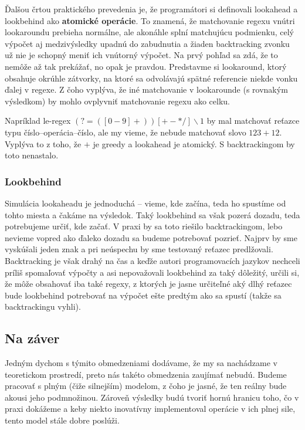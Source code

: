 Ďalšou črtou praktického prevedenia je, že programátori si definovali lookahead a lookbehind ako \textbf{atomické operácie}\cite{LApracticalnote}. To znamená, že matchovanie regexu vnútri lookaroundu prebieha normálne, ale akonáhle splní matchujúcu podmienku, celý výpočet aj medzivýsledky upadnú do zabudnutia a žiaden back\-tracking zvonku už nie je schopný meniť ich vnútorný výpočet. Na prvý pohľad sa zdá, že to nemôže až tak prekážať, no opak je pravdou. Predstavme si lookaround, ktorý obsahuje okrúhle zátvorky, na ktoré sa odvolávajú spätné referencie niekde vonku ďalej v regexe. Z čoho vyplýva, že iné matchovanie v lookarounde (s rovnakým výsledkom) by mohlo ovplyvniť matchovanie regexu ako celku.

Napríklad le-regex $(?=([0-9]+))[+-*/]\backslash 1$ by mal matchovať reťazce typu číslo--operácia--číslo, ale my vieme, že nebude matchovať slovo $123+12$. Vyplýva to z toho, že $+$ je greedy a lookahead je atomický. S backtrackingom by toto nenastalo.

\subsubsection{Lookbehind}
\label{praxlb}

Simulácia lookaheadu je jednoduchá -- vieme, kde začína, teda ho spustíme od tohto miesta a čakáme na výsledok. Taký lookbehind sa však pozerá dozadu, teda potrebujeme určiť, kde začať. V praxi by sa toto riešilo backtrackingom, lebo nevieme vopred ako ďaleko dozadu sa budeme potrebovať pozrieť. Najprv by sme vyskúšali jeden znak a pri neúspechu by sme testovaný reťazec predlžovali. Backtracking je však drahý na čas a keďže autori programovacích jazykov nechceli príliš spomaľovať výpočty a asi nepovažovali lookbehind za taký dôležitý, určili si, že môže obsahovať iba také regexy, z ktorých je jasne určiteľné aký dlhý reťazec bude lookbehind potrebovať na výpočet ešte predtým ako sa spustí (takže sa backtrackingu vyhli)\cite{LApracticalnote}. 

\subsection*{Na záver}
\label{praxzaver}

Jedným dychom s týmito obmedzeniami dodávame, že my sa nachádzame v teo\-re\-tic\-kom prostredí, preto nás takéto obmedzenia zaujímať nebudú. Budeme pracovať s plným (čiže silnejším) modelom, z čoho je jasné, že ten reálny bude akousi jeho pod\-mno\-ži\-nou. Zároveň výsledky budú tvoriť hornú hranicu toho, čo v praxi dokážeme a keby niekto inovatívny implementoval operácie v ich plnej sile, tento model stále dobre poslúži.